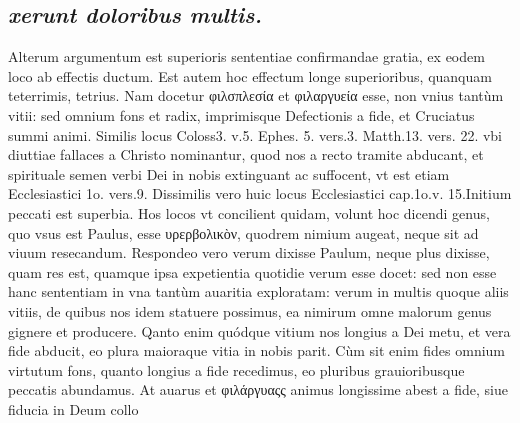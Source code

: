 \documentclass{article}
\begin{document}
\begin{pages}
\subsection*{\textit{xerunt doloribus multis. }}\pstart Alterum argumentum est superioris sententiae confirmandae gratia, ex eodem loco ab effectis ductum. Est autem hoc effectum longe superioribus, quanquam teterrimis, tetrius. Nam docetur φιλσπλεσία et φιλαργυεία esse, non vnius tantùm vitii: sed omnium fons et radix, imprimisque Defectionis a fide, et Cruciatus summi animi. Similis locus Coloss3. v.5. Ephes. 5. vers.3. Matth.13. vers. 22. vbi diuttiae fallaces a Christo nominantur, quod nos a recto tramite abducant, et spirituale semen verbi Dei in nobis extinguant ac suffocent, vt est etiam Ecclesiastici 1o. vers.9. Dissimilis vero huic locus Ecclesiastici cap.1o.v. 15.Initium peccati est superbia.  \pend\pstart Hos locos vt concilient quidam, volunt hoc dicendi genus, quo vsus est Paulus, esse υρερβολικὸν, quodrem nimium augeat, neque sit ad viuum resecandum. Respondeo vero verum dixisse Paulum, neque plus dixisse, quam res est, quamque ipsa expetientia quotidie verum esse docet: sed non esse hanc sententiam in vna tantùm auaritia exploratam: verum in multis quoque aliis vitiis, de quibus nos idem statuere possimus, ea nimirum omne malorum genus gignere et producere. Qanto enim quódque vitium nos longius a Dei metu, et vera fide abducit, eo plura maioraque vitia in nobis parit. Cùm sit enim fides omnium virtutum fons, quanto longius a fide recedimus, eo pluribus grauioribusque peccatis abundamus. At auarus et φιλάργυαςς animus longissime abest a fide, siue fiducia in Deum collo\pend

\end{pages}
\end{document}
